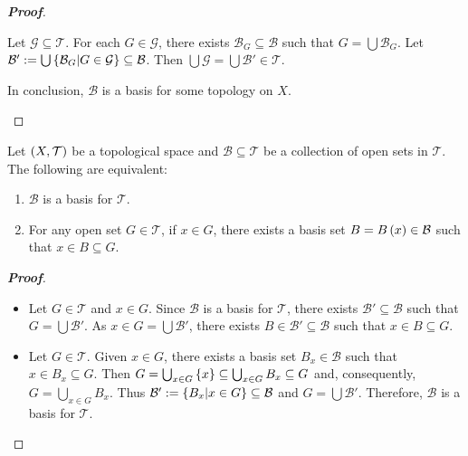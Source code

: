 \begin{proposition}
\begin{proof}[\rm\textbf{Proof}]
\begin{itemize}
      Let $\mathcal{G}\subseteq\mathcal{T}$. For each $G\in\mathcal{G}$, there exists $\mathcal{B}_G\subseteq\mathcal{B}$ such that $G=\bigcup{\mathcal{B}_G}$. Let $\mathcal{B}':=\bigcup\left\{\mathcal{B}_G\middle|G\in\mathcal{G}\right\}\subseteq\mathcal{B}$. Then $\bigcup{\mathcal{G}}=\bigcup{\mathcal{B}'}\in\mathcal{T}$.

      In conclusion, $\mathcal{B}$ is a basis for some topology on $X$.
    \end{itemize}
  \end{proof}
\end{proposition}

\begin{proposition}
  Let $\left(X,\mathcal{T}\right)$ be a topological space and $\mathcal{B}\subseteq\mathcal{T}$ be a collection of open sets in $\mathcal{T}$. The following are equivalent:

  \begin{enumerate}
    \item $\mathcal{B}$ is a basis for $\mathcal{T}$.
    \item For any open set $G\in\mathcal{T}$, if $x\in G$, there exists a basis set $B=B\left(x\right)\in\mathcal{B}$ such that $x\in B\subseteq G$.
  \end{enumerate}
  \begin{proof}[\rm\textbf{Proof}]
    \hfill
    \begin{itemize}
      \item[\boxed{1\Rightarrow2}] Let $G\in\mathcal{T}$ and $x\in G$. Since $\mathcal{B}$ is a basis for $\mathcal{T}$, there exists $\mathcal{B}'\subseteq\mathcal{B}$ such that $G=\bigcup{\mathcal{B}'}$. As $x\in G=\bigcup{\mathcal{B}'}$, there exists $B\in\mathcal{B}'\subseteq\mathcal{B}$ such that $x\in B\subseteq G$.
      \item[\boxed{2\Rightarrow1}] Let $G\in\mathcal{T}$. Given $x\in G$, there exists a basis set $B_x\in\mathcal{B}$ such that $x\in B_x\subseteq G$. Then $G=\bigcup_{x\in G}{\left\{x\right\}}\subseteq\bigcup_{x\in G}{B_x}\subseteq G$ and, consequently, $G=\bigcup_{x\in G}{B_x}$. Thus $\mathcal{B}':=\left\{B_x\middle|x\in G\right\}\subseteq\mathcal{B}$ and $G=\bigcup{\mathcal{B}'}$. Therefore, $\mathcal{B}$ is a basis for $\mathcal{T}$.
    \end{itemize}
  \end{proof}
\end{proposition}

